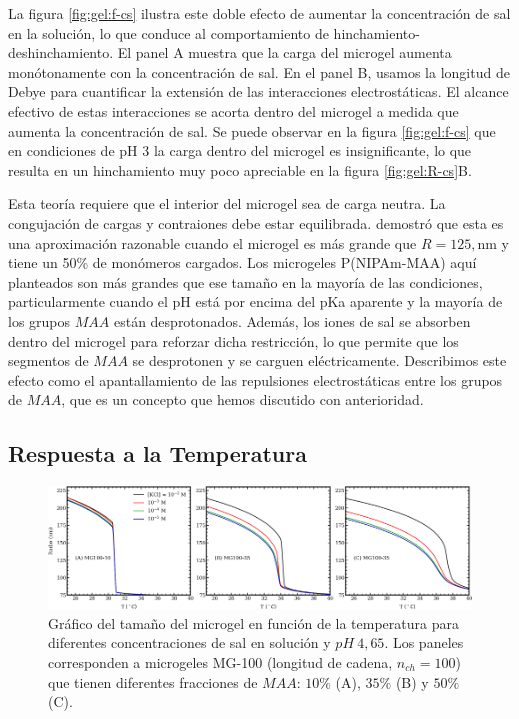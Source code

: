La figura \ref{fig:gel:f-cs} ilustra este doble efecto de aumentar la concentraci\'on de sal en la soluci\'on, lo que conduce al comportamiento de hinchamiento-deshinchamiento. El panel A muestra que la carga del microgel aumenta mon\'otonamente con la concentraci\'on de sal. En el panel B, usamos la longitud de Debye para cuantificar la extensi\'on de las interacciones electrost\'aticas.%
El alcance efectivo de estas interacciones se acorta dentro del microgel a medida que aumenta la concentraci\'on de sal. Se puede observar en la figura \ref{fig:gel:f-cs} que en condiciones de pH 3 la carga dentro del microgel es insignificante, lo que resulta en un hinchamiento muy poco apreciable en la figura \ref{fig:gel:R-cs}B.

Esta teor\'ia requiere que el interior del microgel sea de carga neutra. La congujaci\'on de cargas y contraiones debe estar equilibrada. \citet{Claudio2009} demostr\'o que esta es una aproximaci\'on razonable cuando el microgel es m\'as grande que $R = 125,\text{nm}$ y tiene un 50\% de mon\'omeros cargados. Los microgeles P(NIPAm-MAA) aqu\'i planteados son m\'as grandes que ese tama\~no en la mayor\'ia de las condiciones, particularmente cuando el pH est\'a por encima del pKa aparente y la mayor\'ia de los grupos $MAA$ est\'an desprotonados. Adem\'as, los iones de sal se absorben dentro del microgel para reforzar dicha restricci\'on, lo que permite que los segmentos de $MAA$ se desprotonen y se carguen el\'ectricamente. Describimos este efecto como el apantallamiento de las repulsiones electrost\'aticas entre los grupos de $MAA$, que es un concepto que hemos discutido con anterioridad.


\subsection{Respuesta a la Temperatura}\label{sec:gel:temperature}

\begin{figure}[!htb]
	\centering
	\includegraphics[width=1\linewidth]{Figures/graph-gel/R-T.pdf}
	\caption{Gr\'afico del tama\~no del microgel en funci\'on de la temperatura para diferentes concentraciones de sal en soluci\'on y $pH~4,65$.
		Los paneles corresponden a microgeles MG-100 (longitud de cadena, $n_{ch}=100$) que tienen diferentes fracciones de $MAA$: $10\%$ (A), $35\%$ (B) y $50\%$ (C).}
	\label{fig:gel:R-T}
\end{figure}

